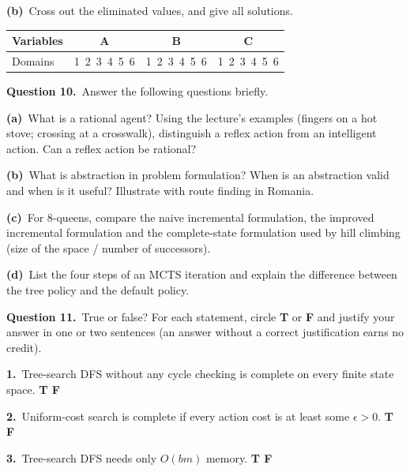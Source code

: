 \documentclass[11pt,a4paper]{article}
\newcommand{\question}[1]{\par\medskip\noindent\textbf{Question #1.}\ }
\newcommand{\subq}[1]{\par\smallskip\noindent\textbf{#1}\ }
\begin{document}
\subq{(b)}Cross out the eliminated values, and give all solutions.\begin{center}\small\begin{tabular}{|l|c|c|c|}\hline Variables & \textbf{A} & \textbf{B} & \textbf{C}\\ \hline Domains & 1\ 2\ 3\ 4\ 5\ 6 & 1\ 2\ 3\ 4\ 5\ 6 & 1\ 2\ 3\ 4\ 5\ 6\\ \hline\end{tabular}\end{center}
\begin{ansbox}[height=0.9cm]\end{ansbox}
\question{10}Answer the following questions briefly.
\subq{(a)}What is a rational agent? Using the lecture's examples (fingers on a hot stove; crossing at a crosswalk), distinguish a reflex action from an intelligent action. Can a reflex action be rational?
\begin{ansbox}[height=2.4cm]\end{ansbox}
\subq{(b)}What is abstraction in problem formulation? When is an abstraction valid and when is it useful? Illustrate with route finding in Romania.
\begin{ansbox}[height=2.4cm]\end{ansbox}
\subq{(c)}For 8-queens, compare the naive incremental formulation, the improved incremental formulation and the complete-state formulation used by hill climbing (size of the space / number of successors).
\begin{ansbox}[height=2.4cm]\end{ansbox}
\subq{(d)}List the four steps of an MCTS iteration and explain the difference between the tree policy and the default policy.
\begin{ansbox}[height=2.0cm]\end{ansbox}
\question{11}True or false?
For each statement, circle \textbf{T} or \textbf{F} and justify your answer in one or two sentences (an answer without a correct justification earns no credit).
\subq{1.}Tree-search DFS without any cycle checking is complete on every finite state space. \hfill \textbf{T \quad F}
\begin{ansbox}[height=1.5cm]\end{ansbox}
\subq{2.}Uniform-cost search is complete if every action cost is at least some $\epsilon>0$. \hfill \textbf{T \quad F}
\begin{ansbox}[height=1.5cm]\end{ansbox}
\subq{3.}Tree-search DFS needs only $O(bm)$ memory. \hfill \textbf{T \quad F}
\end{document}
